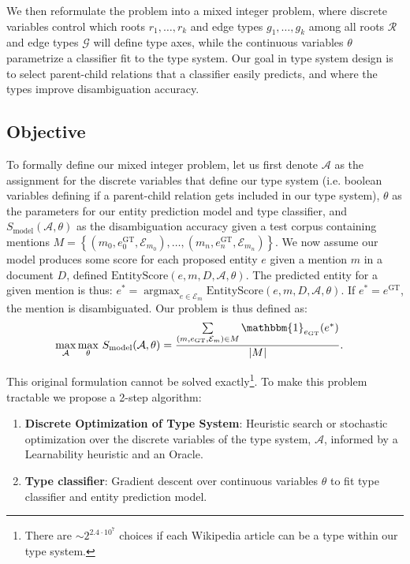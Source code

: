 \documentclass[letterpaper]{article}
\DeclareMathOperator*{\argmax}{argmax}
\begin{document}
We then reformulate the problem into a mixed integer problem, where discrete variables control which roots $r_1,\dots,r_k$ and edge types  $g_1,\dots,g_k$ among all roots $\mathcal{R}$ and edge types $\mathcal{G}$ will define type axes, while the continuous variables $\theta$ parametrize a classifier fit to the type system.
Our goal in type system design is to select parent-child relations that a classifier easily predicts, and where the types improve disambiguation accuracy.

\subsection{Objective}
To formally define our mixed integer problem, let us first denote $\mathcal{A}$ as the assignment for the discrete variables that define our type system (i.e. boolean variables defining if a parent-child relation gets included in our type system), $\theta$ as the parameters for our entity prediction model and type classifier, and $S_{\mathrm{model}}(\mathcal{A}, \theta)$ as the disambiguation accuracy given a test corpus containing mentions $M=\left\{(m_0, e_{0}^{\mathrm{GT}}, \mathcal{E}_{m_0}),\dots,(m_n, e_{n}^{\mathrm{GT}}, \mathcal{E}_{m_n})\right\}$. We now assume our model produces some score for each proposed entity $e$ given a mention $m$ in a document $D$, defined $\mathrm{EntityScore}(e,m,D, \mathcal{A}, \theta)$. The predicted entity for a given mention is thus: $e^*=\argmax_{e\in \mathcal{E}_m}{\mathrm{EntityScore}(e,m,D, \mathcal{A}, \theta)}$. If $e^* = e^{\mathrm{GT}}$, the mention is disambiguated. Our problem is thus defined as:
\begin{align}
\max\limits_{\mathcal{A}} \max\limits_{\theta}\,S_{\mathrm{model}}(\mathcal{A}, \theta) &= \frac{\sum\limits_{(m, e_{\mathrm{GT}}, \mathcal{E}_m)\in M} \mathbbm{1}_{e_{\mathrm{GT}}} (e^*)}{|M|}.
\end{align}



This original formulation cannot be solved exactly\footnote{There are $\sim2^{2.4\cdot 10^7}$ choices if each Wikipedia article can be a type within our type system.}. To make this problem tractable we propose a 2-step algorithm:

\begin{enumerate}
\item {\bf Discrete Optimization of Type System}: Heuristic search or stochastic optimization over the discrete variables of the type system, $\mathcal{A}$, informed by a Learnability heuristic and an Oracle.
\item {\bf Type classifier}: Gradient descent over continuous variables $\theta$ to fit type classifier and entity prediction model.
\end{enumerate}
\end{document}
